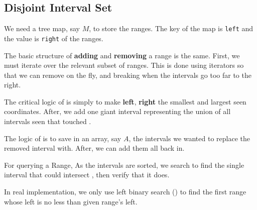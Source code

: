 \subsection{Disjoint Interval Set}
We need a tree map, say $M$,  to store the ranges. The key of the map is  \texttt{left} and the value is \texttt{right} of the ranges.

The basic structure of \textbf{adding} and \textbf{removing} a range is the same. First, we must iterate over the relevant subset of ranges. This is done using iterators so that we can remove on the fly, and breaking when the intervals go too far to the right.

The critical logic of  is simply to make \textbf{left}, \textbf{right} the smallest and largest seen coordinates. After, we add one giant interval representing the union of all intervals seen that touched .

The logic of  is to save in an array, say $A$, the intervals we wanted to replace the removed interval with. After, we can add them all back in.

For querying a Range, As the intervals are sorted, we search to find the single interval that could intersect \fcj{[left, right)}, then verify that it does.

In real implementation, we only use left binary search () to find the first range whose left is no less than given range's left.

